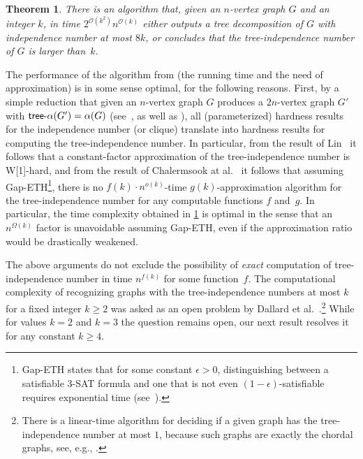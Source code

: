 \documentclass[11pt]{article}
\newtheorem{theorem}{Theorem}[section]
\theoremstyle{definition}
\newcommand{\tin}{\mathsf{tree} \textnormal{-} \alpha}
\newcommand{\OO}{\mathcal{O}}
\newcommand{\W}{\textup{\textsf{W[1]}}}
\begin{document}
\begin{theorem}
\label{the:main_alg}
There is an algorithm that, given an $n$-vertex graph $G$ and an integer $k$, in time $2^{\OO(k^2)} n^{\OO(k)}$ either outputs a tree decomposition of $G$ with independence number at most $8k$, or concludes that the tree-independence number of $G$ is larger than~$k$.
\end{theorem}

The performance of the algorithm from    (the running time and the need of approximation) is in some sense optimal, for the following reasons.
First,  by a simple reduction that given an $n$-vertex graph $G$ produces a $2n$-vertex graph $G'$ with $\tin(G') = \alpha(G)$ (see~\cite{DallardMS24}, as well as ), all (parameterized) hardness results for the independence number (or clique) translate into hardness results for computing the tree-independence number.
In particular, from the result of Lin~\cite{Lin21} it follows that a constant-factor approximation of the tree-independence number is \W-hard, and from the result of Chalermsook at al.~\cite{DBLP:journals/siamcomp/ChalermsookCKLM20} it follows that assuming Gap-ETH\footnote{Gap-ETH states that for some constant $\epsilon > 0$, distinguishing between a satisfiable 3-\textsf{SAT} formula and one that is not even $(1-\epsilon)$-satisfiable requires exponential time (see~\cite{DBLP:conf/icalp/ManurangsiR17,DBLP:journals/eccc/Dinur16}).}, there is no $f(k) \cdot n^{o(k)}$-time $g(k)$-approximation algorithm for the tree-independence number for any computable functions $f$ and~$g$.
In particular, the time complexity obtained in \cref{the:main_alg} is optimal in the sense that an $n^{\Omega(k)}$ factor is unavoidable assuming Gap-ETH, even if the approximation ratio would be drastically weakened.

The above arguments do not exclude the possibility of  \emph{exact} computation of tree-independence number in time $n^{f(k)}$ for some function~$f$.
The computational complexity  of recognizing graphs with the tree-independence numbers at most $k$ for a fixed integer $k \geq 2$ was asked as an open problem by Dallard et al.~\cite[Question~8.3]{DallardMS24}.\footnote{There is a linear-time algorithm for deciding if a given graph has the tree-independence number at most $1$, because such graphs are exactly the chordal graphs, see, e.g., \cite{Golumbic80}.}
While for values $k=2$ and $k=3$ the question remains open,  our next result resolves it for any constant $k\geq 4$.
\end{document}
